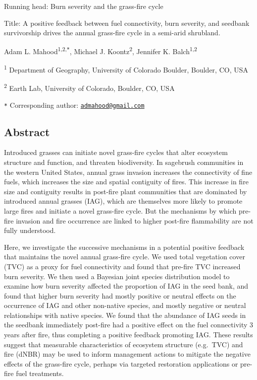 \documentclass[
  12pt,
]{article}
\author{}
\date{\vspace{-2.5em}}
\begin{document}

Running head: Burn severity and the grass-fire cycle

Title: A positive feedback between fuel connectivity, burn severity, and
seedbank survivorship drives the annual grass-fire cycle in a semi-arid
shrubland.

Adam L. Mahood\textsuperscript{1,2,\texttt{*}}, Michael J.
Koontz\textsuperscript{2}, Jennifer K. Balch\textsuperscript{1,2}

\small

\textsuperscript{1} Department of Geography, University of Colorado
Boulder, Boulder, CO, USA

\textsuperscript{2} Earth Lab, University of Colorado, Boulder, CO, USA

\texttt{*} Corresponding author:
\href{mailto:admahood@gmail.com}{\nolinkurl{admahood@gmail.com}}

\normalsize

\newpage

\linenumbers

\hypertarget{abstract}{%
\subsection{Abstract}\label{abstract}}

Introduced grasses can initiate novel grass-fire cycles that alter
ecosystem structure and function, and threaten biodiversity. In
sagebrush communities in the western United States, annual grass
invasion increases the connectivity of fine fuels, which increases the
size and spatial contiguity of fires. This increase in fire size and
contiguity results in post-fire plant communities that are dominated by
introduced annual grasses (IAG), which are themselves more likely to
promote large fires and initiate a novel grass-fire cycle. But the
mechanisms by which pre-fire invasion and fire occurrence are linked to
higher post-fire flammability are not fully understood.

Here, we investigate the successive mechanisms in a potential positive
feedback that maintains the novel annual grass-fire cycle. We used total
vegetation cover (TVC) as a proxy for fuel connectivity and found that
pre-fire TVC increased burn severity. We then used a Bayesian joint
species distribution model to examine how burn severity affected the
proportion of IAG in the seed bank, and found that higher burn severity
had mostly positive or neutral effects on the occurrence of IAG and
other non-native species, and mostly negative or neutral relationships
with native species. We found that the abundance of IAG seeds in the
seedbank immediately post-fire had a positive effect on the fuel
connectivity 3 years after fire, thus completing a positive feedback
promoting IAG. These results suggest that measurable characteristics of
ecosystem structure (e.g.~TVC) and fire (dNBR) may be used to inform
management actions to mitigate the negative effects of the grass-fire
cycle, perhaps via targeted restoration applications or pre-fire fuel
treatments.
\end{document}
